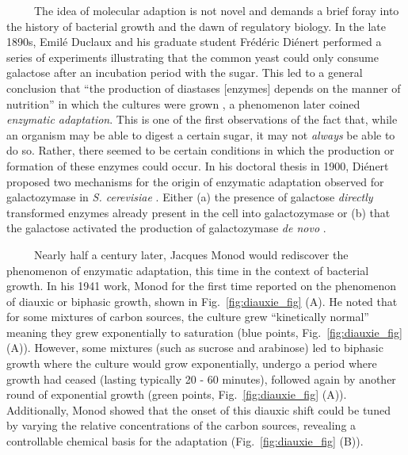 \documentclass[12pt]{caltech_thesis}
\begin{document}
~~~~~The idea of molecular adaption is not novel and demands a brief
foray into the history of bacterial growth and the dawn of regulatory
biology. In the late 1890s, Emilé Duclaux and his graduate student
Frédéric Diénert performed a series of experiments illustrating that the
common yeast could only consume galactose after an incubation period
with the sugar. This led to a general conclusion that ``the production
of diastases {[}enzymes{]} depends on the manner of nutrition'' in which
the cultures were grown \autocite{loison2013}, a phenomenon later coined
\emph{enzymatic adaptation}. This is one of the first observations of
the fact that, while an organism may be able to digest a certain sugar,
it may not \emph{always} be able to do so. Rather, there seemed to be
certain conditions in which the production or formation of these enzymes
could occur. In his doctoral thesis in 1900, Diénert proposed two
mechanisms for the origin of enzymatic adaptation observed for
galactozymase in \emph{S. cerevisiae} \autocite{loison2013}. Either (a)
the presence of galactose \emph{directly} transformed enzymes already
present in the cell into galactozymase or (b) that the galactose
activated the production of galactozymase \emph{de novo}
\autocite{dienert1900,loison2013}.

~~~~~Nearly half a century later, Jacques Monod would rediscover the
phenomenon of enzymatic adaptation, this time in the context of
bacterial growth. In his 1941 work, Monod for the first time reported on
the phenomenon of diauxic or biphasic growth, shown in
Fig.~\ref{fig:diauxie_fig} (A). He noted that for some mixtures of
carbon sources, the culture grew ``kinetically normal'' meaning they
grew exponentially to saturation (blue points,
Fig.~\ref{fig:diauxie_fig} (A)). However, some mixtures (such as sucrose
and arabinose) led to biphasic growth where the culture would grow
exponentially, undergo a period where growth had ceased (lasting
typically 20 - 60 minutes), followed again by another round of
exponential growth (green points, Fig.~\ref{fig:diauxie_fig} (A)).
Additionally, Monod showed that the onset of this diauxic shift could be
tuned by varying the relative concentrations of the carbon sources,
revealing a controllable chemical basis for the adaptation
(Fig.~\ref{fig:diauxie_fig} (B)).
\end{document}
